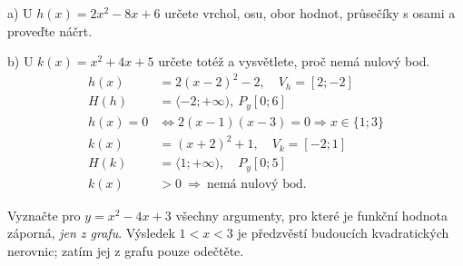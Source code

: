 \documentclass[11pt,a4paper]{article}
\begin{document}
\begin{zadaniReseniBox}[title={Samostatná práce 1}]
a) U $h(x)=2x^2-8x+6$ určete vrchol, osu, obor hodnot, průsečíky s osami a proveďte náčrt.\par
b) U $k(x)=x^2+4x+5$ určete totéž a vysvětlete, proč nemá nulový bod.
\tcblower
\[
\begin{aligned}
h(x)&=2(x-2)^2-2,\quad V_h=[2;-2] \\
H(h)&=\langle-2;+\infty),\ P_y[0;6] \\
h(x)=0&\iff2(x-1)(x-3)=0\Rightarrow x\in\{1;3\} \\
k(x)&=(x+2)^2+1,\quad V_k=[-2;1] \\
H(k)&=\langle1;+\infty),\quad P_y[0;5] \\
k(x)&>0\ \Rightarrow\ \text{nemá nulový bod.}
\end{aligned}
\]

\end{zadaniReseniBox}
Vyznačte pro $y=x^2-4x+3$ všechny argumenty, pro které je funkční hodnota záporná, \emph{jen z grafu}. Výsledek $1<x<3$ je předzvěstí budoucích kvadratických nerovnic; zatím jej z grafu pouze odečtěte.
\end{document}
